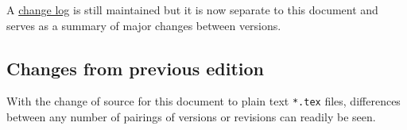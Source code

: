 \documentclass[gap.tex]{subfiles}
\begin{document}
A \href{https://github.com/BlockScope/CIVL-GAP/blob/master/changelog.md}{change
log} is still maintained but it is now separate to this document and serves as
a summary of major changes between versions.

\subsection*{Changes from previous edition}
With the change of source for this document to plain text \texttt{*.tex} files,
differences between any number of pairings of versions or revisions can readily
be seen\footnotemark.
\end{document}
